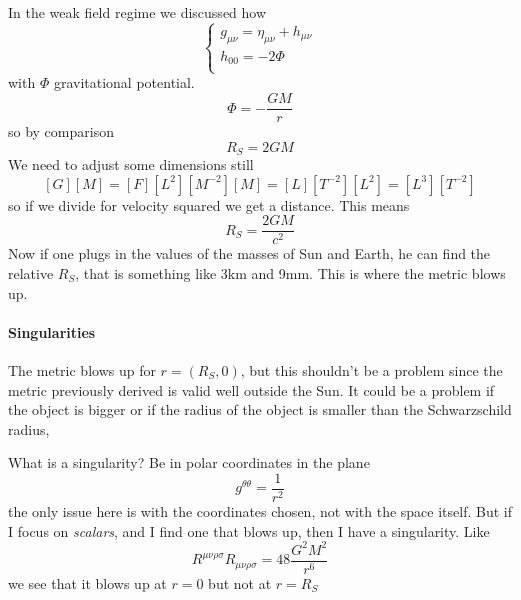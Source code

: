 In the weak field regime we discussed how
\begin{equation}
\begin{cases}
g_{\mu \nu } = \eta _{\mu \nu } + h_{\mu \nu } \\
h_{00} = -2\Phi  \\
\end{cases}
\end{equation}
with $\Phi $ gravitational potential. 
\[
\Phi  =  - \frac{GM}{r}
\]
so by comparison
\[
R_{S} = 2GM
\]
We need to adjust some dimensions still
\[
\left[ G \right] \left[ M \right] = \left[ F \right]\left[ L^{2} \right]\left[ M^{-2} \right]\left[ M \right] = \left[ L \right]\left[ T^{-2} \right]\left[ L^{2} \right] = \left[ L^{3} \right]\left[ T^{-2} \right] 
\]
so if we divide for velocity squared we get a distance. This means
\[
R_{S } = \frac{2GM}{c^{2}}
\]
Now if one plugs in the values of the masses of Sun and Earth, he can find the relative $R_{S}$, that is something like 3km and 9mm. This is where the metric blows up.\par

\paragraph{Singularities}
The metric blows up for $r = \left(R_{S}, 0\right)$, but this shouldn't be a problem since the metric previously derived is valid well outside the Sun. It could be a problem if the object is bigger or if the radius of the object is smaller than the Schwarzschild radius,\par
What is a singularity?  Be in polar coordinates in the plane
\[
g^{\theta \theta } = \frac{1}{r^{2}}
\]
the only issue here is with the coordinates chosen, not with the space itself. But if I focus on \emph{scalars}, and I find one that blows up, then I have a singularity. Like
\[
R^{\mu \nu \rho \sigma }R_{\mu \nu \rho \sigma } = 48 \frac{G^{2}M^{2}}{r^{6}}
\]
we see that it blows up at $r=0$ but not at $r = R_{S}$





















